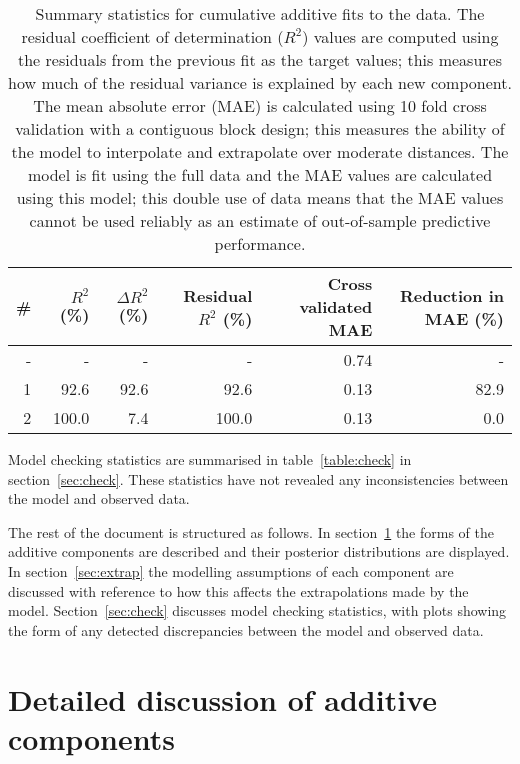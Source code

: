 \documentclass{article} %
\begin{document}
\begin{table}[htb]
\begin{center}
{\small
\begin{tabular}{|r|rrrrr|}
\hline
\bf{\#} & {$R^2$ (\%)} & {$\Delta R^2$ (\%)} & {Residual $R^2$ (\%)} & {Cross validated MAE} & Reduction in MAE (\%)\\
\hline
- & - & - & - & 0.74 & -\\

1 & 92.6 & 92.6 & 92.6 & 0.13 & 82.9\\

2 & 100.0 & 7.4 & 100.0 & 0.13 & 0.0\\

\hline
\end{tabular}
\caption{
Summary statistics for cumulative additive fits to the data.
The residual coefficient of determination ($R^2$) values are computed using the residuals from the previous fit as the target values; this measures how much of the residual variance is explained by each new component.
The mean absolute error (MAE) is calculated using 10 fold cross validation with a contiguous block design; this measures the ability of the model to interpolate and extrapolate over moderate distances.
The model is fit using the full data and the MAE values are calculated using this model; this double use of data means that the MAE values cannot be used reliably as an estimate of out-of-sample predictive performance.
}
\label{table:stats}
}
\end{center}
\end{table}

Model checking statistics are summarised in table~\ref{table:check} in section~\ref{sec:check}.
These statistics have not revealed any inconsistencies between the model and observed data.

The rest of the document is structured as follows.
In section~\ref{sec:discussion} the forms of the additive components are described and their posterior distributions are displayed.
In section~\ref{sec:extrap} the modelling assumptions of each component are discussed with reference to how this affects the extrapolations made by the model.
Section~\ref{sec:check} discusses model checking statistics, with plots showing the form of any detected discrepancies between the model and observed data.

\section{Detailed discussion of additive components}
\label{sec:discussion}
\end{document}
